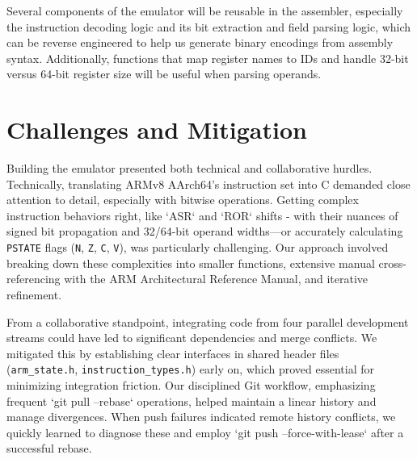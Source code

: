 \documentclass[11pt,a4paper]{article} %
\begin{document}
Several components of the emulator will be reusable in the assembler, especially the instruction decoding logic and its bit extraction and field parsing logic, which can be reverse engineered to help us generate binary encodings from assembly syntax. Additionally, functions that map register names to IDs and handle 32-bit versus 64-bit register size will be useful when parsing operands.

\section{Challenges and Mitigation}
\label{sec:challenges}
Building the emulator presented both technical and collaborative hurdles. Technically, translating ARMv8 AArch64's instruction set into C demanded close attention to detail, especially with bitwise operations. Getting complex instruction behaviors right, like `ASR` and `ROR` shifts - with their nuances of signed bit propagation and 32/64-bit operand widths—or accurately calculating \texttt{PSTATE} flags (\texttt{N}, \texttt{Z}, \texttt{C}, \texttt{V}), was particularly challenging. Our approach involved breaking down these complexities into smaller functions, extensive manual cross-referencing with the ARM Architectural Reference Manual, and iterative refinement.

From a collaborative standpoint, integrating code from four parallel development streams could have led to significant dependencies and merge conflicts. We mitigated this by establishing clear interfaces in shared header files (\texttt{arm\_state.h}, \texttt{instruction\_types.h}) early on, which proved essential for minimizing integration friction. Our disciplined Git workflow, emphasizing frequent `git pull --rebase` operations, helped maintain a linear history and manage divergences. When push failures indicated remote history conflicts, we quickly learned to diagnose these and employ `git push --force-with-lease` after a successful rebase.
\end{document}
